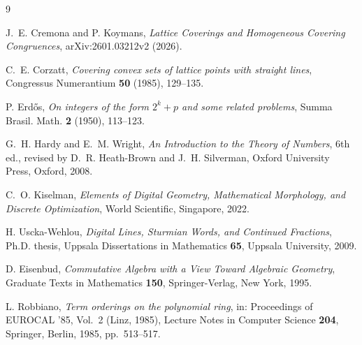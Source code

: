 \documentclass[a4paper,11pt,oneside,reqno]{amsart}
\theoremstyle{definition}
\theoremstyle{remark}
\theoremstyle{plain}
\begin{document}
\begin{thebibliography}{9}

J.~E. Cremona and P. Koymans, \emph{Lattice Coverings and Homogeneous Covering Congruences},
arXiv:2601.03212v2 (2026).

C.~E. Corzatt, \emph{Covering convex sets of lattice points with straight lines}, Congressus
Numerantium \textbf{50} (1985), 129--135.

P. Erd\H{o}s, \emph{On integers of the form \(2^k+p\) and some related problems}, Summa Brasil.
Math. \textbf{2} (1950), 113--123.

G.~H. Hardy and E.~M. Wright, \emph{An Introduction to the Theory of Numbers}, 6th ed., revised
by D.~R. Heath-Brown and J.~H. Silverman, Oxford University Press, Oxford, 2008.

C.~O. Kiselman, \emph{Elements of Digital Geometry, Mathematical Morphology, and Discrete
Optimization}, World Scientific, Singapore, 2022.

H. Uscka-Wehlou, \emph{Digital Lines, Sturmian Words, and Continued Fractions}, Ph.D. thesis,
Uppsala Dissertations in Mathematics \textbf{65}, Uppsala University, 2009.

D. Eisenbud, \emph{Commutative Algebra with a View Toward Algebraic Geometry}, Graduate Texts in
Mathematics \textbf{150}, Springer-Verlag, New York, 1995.

L. Robbiano, \emph{Term orderings on the polynomial ring}, in: Proceedings of EUROCAL '85, Vol.~2
(Linz, 1985), Lecture Notes in Computer Science \textbf{204}, Springer, Berlin, 1985, pp.~513--517.

\end{thebibliography}
\end{document}
